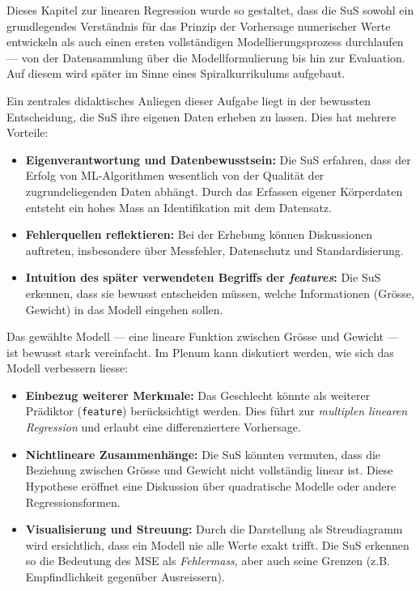 Dieses Kapitel zur linearen Regression wurde so gestaltet, dass die SuS sowohl ein grundlegendes Verständnis für das Prinzip der Vorhersage numerischer Werte entwickeln als auch einen ersten vollständigen Modellierungsprozess durchlaufen — von der Datensammlung über die Modellformulierung bis hin zur Evaluation. Auf diesem wird später im Sinne eines Spiralkurrikulums aufgebaut.

Ein zentrales didaktisches Anliegen dieser Aufgabe liegt in der bewussten Entscheidung, die SuS ihre eigenen Daten erheben zu lassen. Dies hat mehrere Vorteile:

\begin{itemize}
  \item \textbf{Eigenverantwortung und Datenbewusstsein:} Die SuS erfahren, dass der Erfolg von ML-Algorithmen wesentlich von der Qualität der zugrundeliegenden Daten abhängt. Durch das Erfassen eigener Körperdaten entsteht ein hohes Mass an Identifikation mit dem Datensatz.
  
  \item \textbf{Fehlerquellen reflektieren:} Bei der Erhebung können Diskussionen auftreten, insbesondere über Messfehler, Datenschutz und Standardisierung.
  
  \item \textbf{Intuition des später verwendeten Begriffs der \emph{features}:} Die SuS erkennen, dass sie bewusst entscheiden müssen, welche Informationen (Grösse, Gewicht) in das Modell eingehen sollen.
\end{itemize}

Das gewählte Modell — eine lineare Funktion zwischen Grösse und Gewicht — ist bewusst stark vereinfacht. Im Plenum kann diskutiert werden, wie sich das Modell verbessern liesse:

\begin{itemize}
  \item \textbf{Einbezug weiterer Merkmale:} Das Geschlecht könnte als weiterer Prädiktor (\texttt{feature}) berücksichtigt werden. Dies führt zur \emph{multiplen linearen Regression} und erlaubt eine differenziertere Vorhersage.
  
  \item \textbf{Nichtlineare Zusammenhänge:} Die SuS könnten vermuten, dass die Beziehung zwischen Grösse und Gewicht nicht vollständig linear ist. Diese Hypothese eröffnet eine Diskussion über quadratische Modelle oder andere Regressionsformen.
  
  \item \textbf{Visualisierung und Streuung:} Durch die Darstellung als Streudiagramm wird ersichtlich, dass ein Modell nie alle Werte exakt trifft. Die SuS erkennen so die Bedeutung des MSE als \emph{Fehlermass}, aber auch seine Grenzen (z.B. Empfindlichkeit gegenüber Ausreissern).
\end{itemize}


